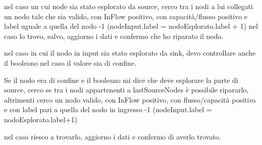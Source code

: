 \documentclass{article}
\begin{document}
nel caso un cui node sia stato esplorato da source, cerco tra i nodi a lui collegati un nodo tale che sia valido, con InFlow positivo, con capacità/flusso positivo e label uguale a quella del nodo -1 (nodeInput.label = nodoEsplorato.label + 1)
nel caso lo trovo, salvo, aggiorno i dati e confermo che ho riparato il nodo.

nel caso in cui il nodo in input sia stato esplorato da sink, devo controllare anche il booleano nel caso il valore sia di confine.

Se il nodo era di confine e il booleano mi dice che deve esplorare la parte di source, cerco se tra i nodi appartenenti a lastSourceNodes è possibile ripararlo,
altrimenti cerco un nodo valido, con InFlow positivo, con flusso/capacità positiva e con label pari a quella del nodo in ingresso -1 (nodeInput.label = nodoEsplorato.label+1)

nel caso riesco a trovarlo, aggiorno i dati e confermo di averlo trovato.
\end{document}
